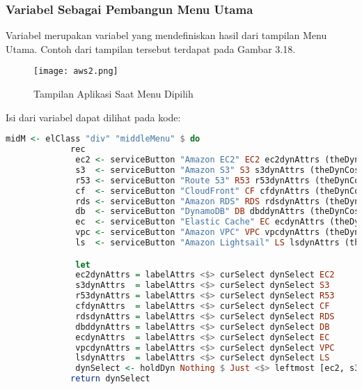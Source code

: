 \documentclass[pi.tex]{subfile}
\begin{document}
   \subsubsection{Variabel  Sebagai Pembangun Menu Utama}\hspace{10pt}
   Variabel  merupakan variabel yang mendefiniskan hasil dari tampilan Menu Utama. Contoh dari tampilan tersebut terdapat pada Gambar 3.18.

  \begin{figure}[H]
    \centering
  \texttt{[image: aws2.png]}
  \caption[Tampilan Menu Dipilih]{Tampilan Aplikasi Saat Menu Dipilih}
  \end{figure}

  \hspace{10pt}Isi dari variabel  dapat dilihat pada kode: \\
     \begin{lstlisting}[language=Haskell]
       midM <- elClass "div" "middleMenu" $ do
             rec
              ec2 <- serviceButton "Amazon EC2" EC2 ec2dynAttrs (theDynCost rightM 1)
              s3  <- serviceButton "Amazon S3" S3 s3dynAttrs (theDynCost rightM 2)
              r53 <- serviceButton "Route 53" R53 r53dynAttrs (theDynCost rightM 3)
              cf  <- serviceButton "CloudFront" CF cfdynAttrs (theDynCost rightM 4)
              rds <- serviceButton "Amazon RDS" RDS rdsdynAttrs (theDynCost rightM 5)
              db  <- serviceButton "DynamoDB" DB dbddynAttrs (theDynCost rightM 6)
              ec  <- serviceButton "Elastic Cache" EC ecdynAttrs (theDynCost rightM 7)
              vpc <- serviceButton "Amazon VPC" VPC vpcdynAttrs (theDynCost rightM 9)
              ls  <- serviceButton "Amazon Lightsail" LS lsdynAttrs (theDynCost rightM 10)

              let 
	          ec2dynAttrs = labelAttrs <$> curSelect dynSelect EC2
	          s3dynAttrs  = labelAttrs <$> curSelect dynSelect S3
	          r53dynAttrs = labelAttrs <$> curSelect dynSelect R53
	          cfdynAttrs  = labelAttrs <$> curSelect dynSelect CF
	          rdsdynAttrs = labelAttrs <$> curSelect dynSelect RDS
	          dbddynAttrs = labelAttrs <$> curSelect dynSelect DB
	          ecdynAttrs  = labelAttrs <$> curSelect dynSelect EC
	          vpcdynAttrs = labelAttrs <$> curSelect dynSelect VPC
	          lsdynAttrs  = labelAttrs <$> curSelect dynSelect LS
              dynSelect <- holdDyn Nothing $ Just <$> leftmost [ec2, s3, r53, cf, rds, db, ec, vpc, ls]
             return dynSelect
     \end{lstlisting}
\end{document}
